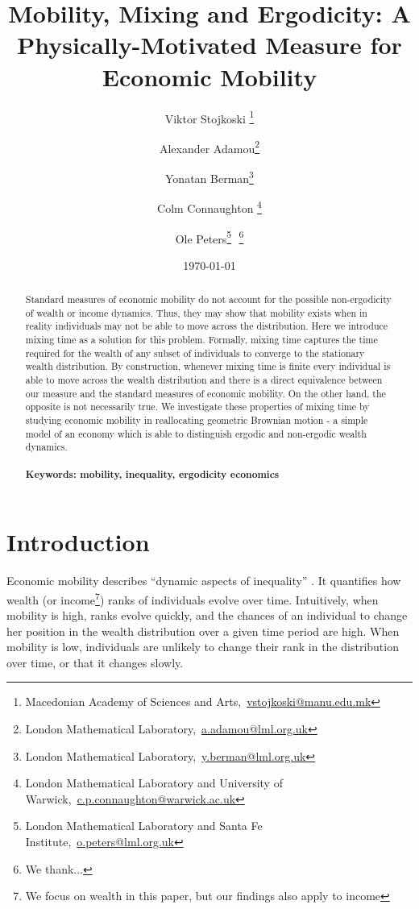 \documentclass[11pt]{article}
\newcommand{\bc}{\begin{center}}
\newcommand{\ec}{\end{center}}
\newcommand{\red}[1]{{\color{red} #1}}
\numberwithin{equation}{section}
\begin{document}
\begin{titlepage}
\title{Mobility, Mixing and Ergodicity: A Physically-Motivated Measure for Economic Mobility}
\author{Viktor Stojkoski \footnote{Macedonian Academy of Sciences and Arts,~\url{vstojkoski@manu.edu.mk}} \and Alexander Adamou\footnote{London Mathematical Laboratory,~\url{a.adamou@lml.org.uk}} \and Yonatan Berman\footnote{London Mathematical Laboratory,~\url{y.berman@lml.org.uk}} \and Colm Connaughton \footnote{London Mathematical Laboratory and University of Warwick,~\url{c.p.connaughton@warwick.ac.uk}} \and Ole Peters\footnote{London Mathematical Laboratory and Santa Fe Institute,~\url{o.peters@lml.org.uk}}\,\, \thanks{We thank...}}
\date{\today}
\maketitle
\begin{abstract}
\noindent Standard measures of economic mobility do not account for the possible non-ergodicity of wealth or income dynamics. Thus, they may show that mobility exists when in reality individuals may not be able to move across the distribution. Here we introduce mixing time as a solution for this problem. Formally, mixing time captures the time required for the wealth of any subset of individuals to converge to the stationary wealth distribution. By construction, whenever mixing time is finite every individual is able to move across the wealth distribution and there is a direct equivalence between our measure and the standard measures of economic mobility. On the other hand, the opposite is not necessarily true. We investigate these properties of mixing time by studying economic mobility in reallocating geometric Brownian motion - a simple model of an economy which is able to distinguish ergodic and non-ergodic wealth dynamics.
\\
\\
\noindent\textbf{Keywords: mobility, inequality, ergodicity economics}
\end{abstract}
\setcounter{page}{0}
\thispagestyle{empty}
\end{titlepage}
\pagebreak \newpage
\section{Introduction}\label{sec:introduction}
Economic mobility describes ``dynamic aspects of inequality'' \citep{Shorrocks1978}. It quantifies how wealth (or income\footnote{We focus on wealth in this paper, but our findings also apply to income}) ranks of individuals evolve over time. Intuitively, when mobility is high, ranks evolve quickly, and the chances of an individual to change her position in the wealth distribution over a given time period are high. When mobility is low, individuals are unlikely to change their rank in the distribution over time, or that it changes slowly.
\end{document}
